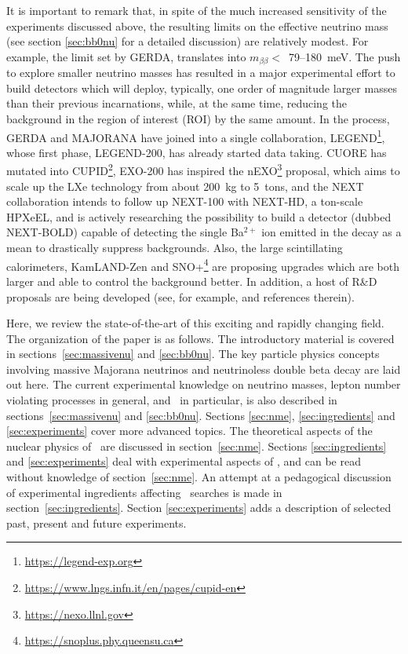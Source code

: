 It is important to remark that, in spite of the much increased sensitivity of the experiments discussed above, the resulting limits on the effective neutrino mass (see section \ref{sec:bb0nu} for a detailed discussion) are relatively modest. For example, the limit set by GERDA, translates into $m_{\beta\beta} <$~79--180~meV. The push to explore smaller neutrino masses has resulted in a major experimental effort to build detectors which will deploy, typically, one order of magnitude larger masses than their previous incarnations, while, at the same time, reducing the background in the region of interest (ROI) by the same amount. In the process, GERDA and MAJORANA have joined into a single collaboration, LEGEND\footnote{\url{https://legend-exp.org}}, whose first phase, LEGEND-200, has already started data taking. CUORE has mutated into CUPID\footnote{\url{https://www.lngs.infn.it/en/pages/cupid-en}}, EXO-200 has inspired the nEXO\footnote{\url{https://nexo.llnl.gov}} proposal, which aims to scale up the LXe technology from about 200~kg to 5~tons, and the NEXT collaboration intends to follow up NEXT-100 with NEXT-HD, a ton-scale HPXeEL, and is actively researching the possibility to build a detector (dubbed NEXT-BOLD) capable of detecting the single Ba$^{2+}$ ion emitted in the decay as a mean to drastically suppress backgrounds. Also, the large scintillating calorimeters, KamLAND-Zen and SNO+\footnote{\url{https://snoplus.phy.queensu.ca}} are proposing upgrades which are both larger and able to control the background better. In addition, a host of R\&D proposals are being developed (see, for example, \cite{Dell_Oro_2016} and references therein).

Here, we review the state-of-the-art of this exciting and rapidly changing field. 
The organization of the paper is as follows. The introductory material is covered in sections~\ref{sec:massivenu} and \ref{sec:bb0nu}. The key particle physics concepts involving massive Majorana neutrinos and neutrinoless double beta decay are laid out here. The current experimental knowledge on neutrino masses, lepton number violating processes in general, and \bbonu\ in particular, is also described in sections~\ref{sec:massivenu} and \ref{sec:bb0nu}. Sections \ref{sec:nme}, \ref{sec:ingredients} and \ref{sec:experiments} cover more advanced topics. The theoretical aspects of the nuclear physics of \bbonu\ are discussed in section~\ref{sec:nme}. Sections \ref{sec:ingredients} and \ref{sec:experiments} deal with experimental aspects of \bbonu, and can be read without knowledge of section~\ref{sec:nme}. An attempt at a pedagogical discussion of experimental ingredients affecting \bbonu\ searches is made in section~\ref{sec:ingredients}. Section \ref{sec:experiments} adds a description of selected past, present and future experiments. 

